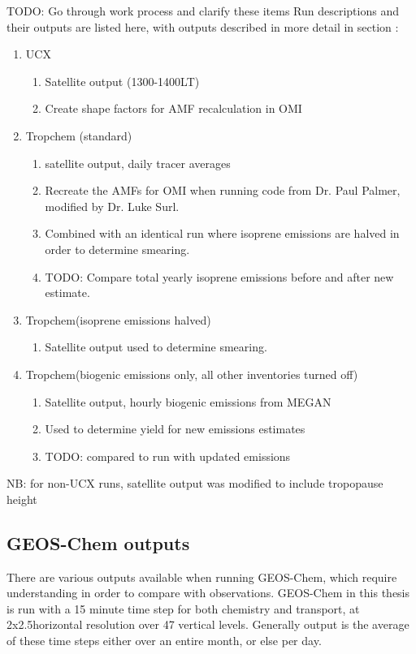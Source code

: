     TODO: Go through work process and clarify these items
    Run descriptions and their outputs are listed here, with outputs described in more detail in section :
    \begin{enumerate}
      \item UCX 
      \begin{enumerate}
        \item Satellite output (1300-1400LT)
        \item Create shape factors for AMF recalculation in OMI
      \end{enumerate}
      
      \item Tropchem (standard)
      \begin{enumerate}
        \item satellite output, daily tracer averages
        \item Recreate the AMFs for OMI when running code from Dr. Paul Palmer, modified by Dr. Luke Surl.
        \item Combined with an identical run where isoprene emissions are halved in order to determine smearing.
        \item TODO: Compare total yearly isoprene emissions before and after new estimate.
      \end{enumerate}
      
      \item Tropchem(isoprene emissions halved)
      \begin{enumerate}
        \item Satellite output used to determine smearing.
      \end{enumerate}
      
      \item Tropchem(biogenic emissions only, all other inventories turned off)
      \begin{enumerate}
        \item Satellite output, hourly biogenic emissions from MEGAN
        \item Used to determine yield for new emissions estimates
        \item TODO: compared to run with updated emissions
      \end{enumerate}
    \end{enumerate}
    NB: for non-UCX runs, satellite output was modified to include tropopause height
  
  \subsection{GEOS-Chem outputs}
    \label{Model:GC:outputs}
    There are various outputs available when running GEOS-Chem, which require understanding in order to compare with observations.
    GEOS-Chem in this thesis is run with a 15 minute time step for both chemistry and transport, at 2x2.5\degr horizontal resolution over 47 vertical levels.
    Generally output is the average of these time steps either over an entire month, or else per day.
    
